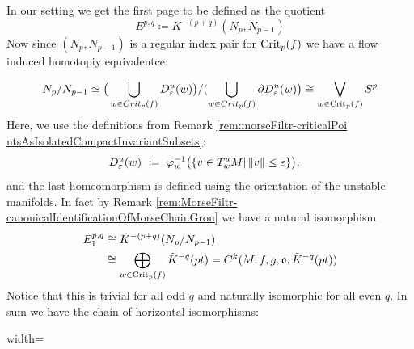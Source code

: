 \begin{corollary}
	In our setting we get the first page to be defined as the quotient
	\begin{equation*}
		E^{p,q}  \coloneq K^{-(p+q)}(N_p,N_{p-1})
	\end{equation*}
	Now since $(N_p,N_{p-1})$ is a regular index pair for $\mathrm{Crit}_p(f)$ we have a flow induced homotopiy equivalentce:
	
	\begin{equation*}
		N_p\slash N_{p-1}
		\simeq          \big(\bigcup_{w\in Crit_p(f)}D^u_\varepsilon(w)\big) \slash (\bigcup_{w\in Crit_p(f)} \partial D^u_\varepsilon(w)\big)
		\cong           \bigvee_{w\in \mathrm{Crit}_p(f)}S^p
	\end{equation*} Here, we use the definitions from Remark \ref{rem:morseFiltr-criticalPoi
ntsAsIsolatedCompactInvariantSubsets}:
	\begin{align*}
		D^{u}_\varepsilon (w)&~\coloneq~ \varphi_w^{-1} \big(\{v\in T_w^{u }M | \left\lVert v\right\rVert\leq \varepsilon \} \big),
	\end{align*}and the last homeomorphism is defined using the orientation of the unstable manifolds. 
	In fact by Remark \ref{rem:MorseFiltr-canonicalIdentificationOfMorseChainGrou} we have a natural isomorphism 
	\begin{align}\label{def: The Map between E_1 and Morse chain group}
		E^{p,q}_1&\cong \tilde{K}^{-(p+q)}(N_p\slash N_{p-1})\\
		&\cong \bigoplus_{w\in \mathrm{Crit}_p(f)}\tilde{K}^{-q}(pt)=C^k(M,f,g,\mathfrak{o};\tilde{K}^{-q}(pt))\\
	\end{align} Notice that this is trivial for all odd $q$ and naturally isomorphic for all even $q$. In sum we have the chain of horizontal isomorphisms:
	\begin{fdiagram}\label{diag: first page comparison}
		\begin{adjustbox}{width=\textwidth}
\end{adjustbox}
\end{fdiagram}
\end{corollary}
